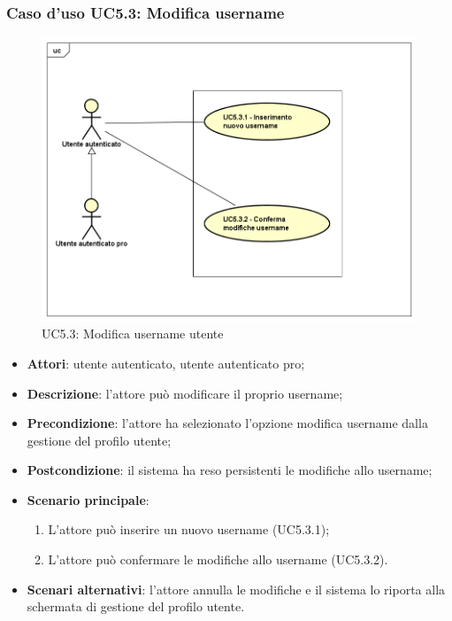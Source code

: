 \subsubsection{Caso d'uso UC5.3: Modifica username}
\label{UC5.3}
\begin{figure}[h]
	\centering
	\includegraphics[scale=0.5,keepaspectratio]{UML/UC5_3.png}
	\caption{UC5.3: Modifica username utente}
\end{figure}
\begin{itemize}
	\item \textbf{Attori}: utente autenticato, utente autenticato pro;
	\item \textbf{Descrizione}: l'attore può modificare il proprio username;
	\item \textbf{Precondizione}: l'attore ha selezionato l'opzione modifica username dalla gestione del profilo utente; 
	\item \textbf{Postcondizione}: il sistema ha reso persistenti le modifiche allo username;
	\item \textbf{Scenario principale}:
	\begin{enumerate}
		\item L'attore può inserire un nuovo username (UC5.3.1);
		\item L'attore può confermare le modifiche allo username (UC5.3.2).
	\end{enumerate}
	\item \textbf{Scenari alternativi}: l'attore annulla le modifiche e il sistema lo riporta alla schermata di gestione del profilo utente.
\end{itemize}

